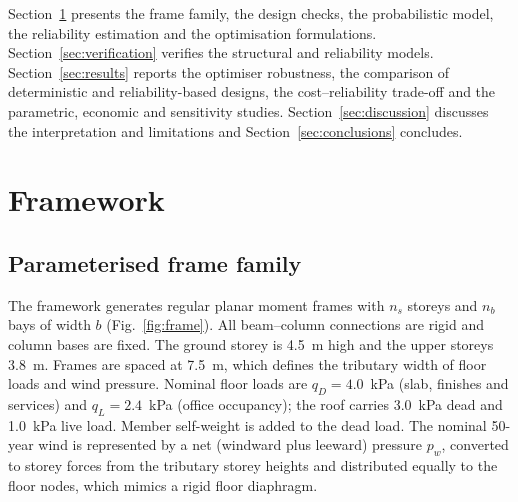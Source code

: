 Section~\ref{sec:framework} presents the frame family, the design checks, the probabilistic
model, the reliability estimation and the optimisation formulations. Section~\ref{sec:verification}
verifies the structural and reliability models. Section~\ref{sec:results} reports the optimiser
robustness, the comparison of deterministic and reliability-based designs, the cost--reliability
trade-off and the parametric, economic and sensitivity studies. Section~\ref{sec:discussion}
discusses the interpretation and limitations and Section~\ref{sec:conclusions} concludes.

\begin{table}[!htbp]
\centering
\caption{Closely related studies. Entries for \citet{Papadrakakis2004} and \citet{TruongKim2017}
were taken from the full texts. Entries marked $^\dagger$ were taken from the abstracts and bibliographic
records only, because the full texts were not available to the authors; n.r.\ = not reported there;
-- = not applicable.
MRF: moment-resisting frame; MCS: Monte Carlo simulation; LHS: Latin hypercube sampling; ES:
evolution strategies; FR/PR: fully/partially restrained connections.}
\label{tab:literature}
\scriptsize
\fittable{}
\end{table}

\section{Framework}\label{sec:framework}

\subsection{Parameterised frame family}\label{sec:frames}

The framework generates regular planar moment frames with $n_s$ storeys and $n_b$ bays of
width $b$ (Fig.~\ref{fig:frame}). All beam--column connections are rigid and column bases are
fixed. The ground storey is 4.5~m high and the upper storeys 3.8~m. Frames are spaced at
7.5~m, which defines the tributary width of floor loads and wind pressure. Nominal floor loads
are $q_D = 4.0$~kPa (slab, finishes and services) and $q_L = 2.4$~kPa (office occupancy); the
roof carries 3.0~kPa dead and 1.0~kPa live load. Member self-weight is added to the dead load.
The nominal 50-year wind is represented by a net (windward plus leeward) pressure $p_w$,
converted to storey forces from the tributary storey heights and distributed equally to the
floor nodes, which mimics a rigid floor diaphragm.


